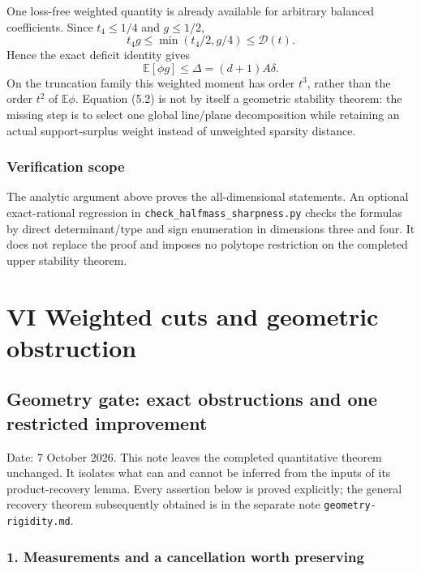 \documentclass[
  11pt,
]{article}
\begin{document}
One loss-free weighted quantity is already available for arbitrary
balanced coefficients. Since \(t_4\le1/4\) and \(g\le1/2\), \[
 t_4g\le\min(t_4/2,g/4)\le\mathscr D(t).
\] Hence the exact deficit identity gives \[
 \boxed{\mathbb E[\phi g]\le\Delta=(d+1)A\delta.}        \tag{5.2}
\] On the truncation family this weighted moment has order \(t^3\),
rather than the order \(t^2\) of \(\mathbb E\phi\). Equation (5.2) is
not by itself a geometric stability theorem: the missing step is to
select one global line/plane decomposition while retaining an actual
support-surplus weight instead of unweighted sparsity distance.

\subsubsection{Verification scope}\label{verification-scope-1}

The analytic argument above proves the all-dimensional statements. An
optional exact-rational regression in
\texttt{check\_halfmass\_sharpness.py} checks the formulas by direct
determinant/type and sign enumeration in dimensions three and four. It
does not replace the proof and imposes no polytope restriction on the
completed upper stability theorem.

\newpage

\section{VI Weighted cuts and geometric
obstruction}\label{vi-weighted-cuts-and-geometric-obstruction}

\subsection{Geometry gate: exact obstructions and one restricted
improvement}\label{geometry-gate-exact-obstructions-and-one-restricted-improvement}

Date: 7 October 2026. This note leaves the completed quantitative
theorem unchanged. It isolates what can and cannot be inferred from the
inputs of its product-recovery lemma. Every assertion below is proved
explicitly; the general recovery theorem subsequently obtained is in the
separate note \texttt{geometry-rigidity.md}.

\subsubsection{1. Measurements and a cancellation worth
preserving}\label{measurements-and-a-cancellation-worth-preserving}
\end{document}
